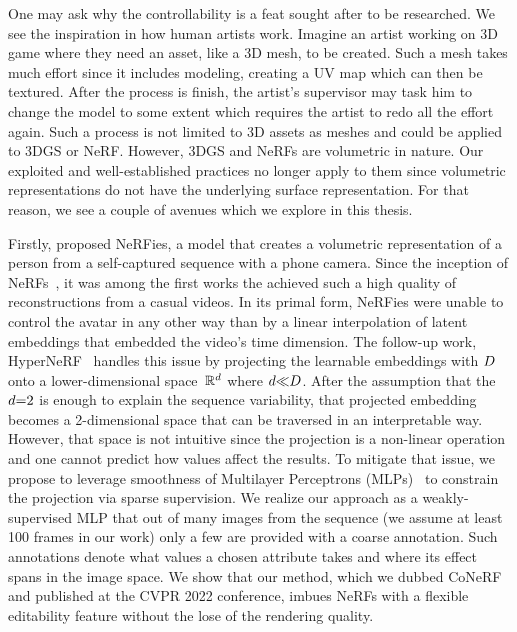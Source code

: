   One may ask why the controllability is a feat sought after to be researched.
  We see the inspiration in how human artists work.
  Imagine an artist working on 3D game where they need an asset, like a 3D
  mesh, to be created.
  Such a mesh takes much effort since it includes modeling, creating a UV map
  which can then be textured.
  After the process is finish, the artist's supervisor may task him to change
  the model to some extent which requires the artist to redo all the effort
  again.
  Such a process is not limited to 3D assets as meshes and could be applied to
  3DGS or NeRF.
  However, 3DGS and NeRFs are volumetric in nature.
  Our exploited and well-established practices no longer apply to them since
  volumetric representations do not have the underlying surface
  representation.
  For that reason, we see a couple of avenues which we explore in this thesis.

  Firstly, \textcite{park2021nerfies} proposed NeRFies, a model that creates a
  volumetric representation of a person from a self-captured sequence with a
  phone camera.
  Since the inception of NeRFs~\cite{mildenhall2020nerf}, it was among the
  first works the achieved such a high quality of reconstructions from a
  casual videos.
  In its primal form, NeRFies were unable to control the avatar in any other
  way than by a linear interpolation of latent embeddings that embedded the
  video's time dimension.
  The follow-up work, HyperNeRF~\cite{park2021hypernerf} handles this issue by
  projecting the learnable embeddings with $D$ onto a
  lower-dimensional space~$\mathbb{R}^d$ where
  $d {\ll}D$.
  After the assumption that the $d{=}2$ is enough to explain
  the sequence variability, that projected embedding becomes a 2-dimensional
  space that can be traversed in an interpretable way.
  However, that space is not intuitive since the projection is a non-linear
  operation and one cannot predict how values affect the results.
  To mitigate that issue, we propose to leverage smoothness of Multilayer
  Perceptrons (MLPs)~\cite{tancik2020fourier,park2021nerfies} to constrain the
  projection via sparse supervision.
  We realize our approach as a weakly-supervised MLP that out of many images
  from the sequence (we assume at least 100 frames in our work) only a few are
  provided with a coarse annotation.
  Such annotations denote what values a chosen attribute takes and where its
  effect spans in the image space.
  We show that our method, which we dubbed CoNeRF~\cite{kania2022conerf} and
  published at the CVPR 2022 conference, imbues NeRFs with a flexible
  editability feature without the lose of the rendering quality.

